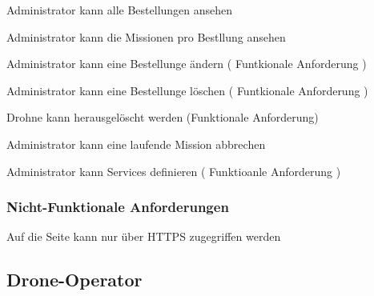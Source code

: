 \begin{todolist}
	\item[\done] Administrator kann alle Bestellungen ansehen
	\item[\done] Administrator kann die Missionen pro Bestllung ansehen
	\item[\xmark] Administrator kann eine Bestellunge ändern ( Funtkionale Anforderung )
	\item[\xmark] Administrator kann eine Bestellunge löschen ( Funtkionale Anforderung )

	\item[\xmark] Drohne kann herausgelöscht werden (Funktionale Anforderung)
	\item[\xmark] Administrator kann eine laufende Mission abbrechen
	\item[\xmark] Administrator kann Services definieren ( Funktioanle Anforderung )

\end{todolist}

\subsubsection{Nicht-Funktionale Anforderungen}	
\begin{todolist}
	\item[\done] Auf die Seite kann nur über HTTPS zugegriffen werden
\end{todolist}

\subsection{Drone-Operator}	
